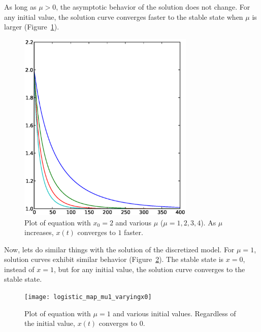 \documentclass[12pt,twoside,draft]{book}
\begin{document}
%
As long as $\mu > 0$, the asymptotic behavior of the solution does not change.
For any initial value, the solution curve converges faster to the stable state when $\mu$ is larger (Figure~\ref{fig:lde2}).
\begin{figure}[h]
  \begin{center}
    \includegraphics[width=0.75\textwidth]{logistic_diffeq_mu1234_x2}
  \end{center}
  \caption{
    Plot of equation  with $x_0 = 2$ and various $\mu$ ($\mu = 1,2,3,4$).
    As $\mu$ increases, $x(t)$ converges to $1$ faster.
  }
  \label{fig:lde2}
\end{figure}
Now, lets do similar things with the solution of the discretized model.
For $\mu = 1$, solution curves exhibit similar behavior (Figure~\ref{fig:logistic1}).
The stable state is $x = 0$, instead of $x = 1$, but for any initial value, the solution curve converges to the stable state.
\begin{figure}[ht]
  \begin{center}
    \texttt{[image: logistic\_map\_mu1\_varyingx0]}
  \end{center}
  \caption{
    Plot of equation  with $\mu = 1$ and various initial values. 
    Regardless of the initial value, $x(t)$ converges to $0$.
}
  \label{fig:logistic1}
\end{figure}
\end{document}
